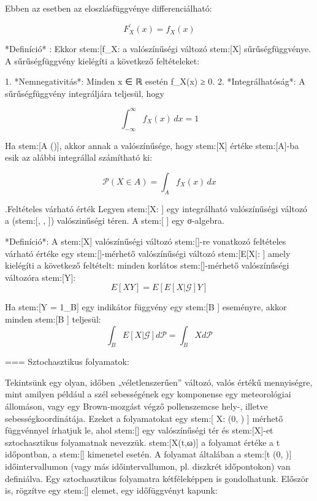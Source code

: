 \documentclass[11pt]{article}
\begin{document}
Ebben az esetben az eloszlásfüggvénye differenciálható:

\[
F_X^{\prime}(x) = f_X(x)
\]

*Definíció* : Ekkor stem:[f_X:  \to [0, \infty)] a valószínűségi változó stem:[X] sűrűségfüggvénye. A sűrűségfüggvény kielégíti a következő feltételeket:

1. *Nemnegativitás*: Minden x ∈ ℝ esetén f_X(x) ≥ 0.
2. *Integrálhatóság*: A sűrűségfüggvény integráljára teljesül, hogy

\[
\int_{-\infty}^{\infty} f_X(x) \, dx = 1
\]

Ha stem:[A \in {}()], akkor annak a valószínűsége, hogy stem:[X] értéke stem:[A]-ba esik az alábbi integrállal számítható ki:

\[
\mathcal{P}(X \in A) = \int_A f_X(x) \, dx
\]

.Feltételes várható érték
Legyen stem:[X: \Omega \to {}] egy integrálható valószínűségi változó a (stem:[\Omega, , ]) valószinűségi téren.
A stem:[ \subseteq {}] egy σ-algebra.

*Definíció*: A stem:[X] valószínűségi változó stem:[]-re vonatkozó feltételes várható értéke egy stem:[]-mérhető valószínűségi változó stem:[E[X|\]: \Omega \to {}]
amely kielégíti a következő feltételt: minden korlátos stem:[]-mérhető valószínűségi változóra stem:[Y]:
\[
E[XY] = E[E[X|\mathcal{G}]Y]
\]

Ha stem:[Y = 1_B] egy indikátor függvény egy stem:[B \in {}] eseményre, akkor minden stem:[B \in {}] teljesül:
\[
\int _B E[X|\mathcal{G}] d\mathcal{P} = \int_B X d\mathcal{P}
\]


=== Sztochasztikus folyamatok:

Tekintsünk egy olyan, időben „véletlenszerűen” változó, valós értékű mennyiségre, mint amilyen például a szél sebességének egy komponense egy meteorológiai állomáson,
vagy egy Brown-mozgást végző pollenszemcse hely-, illetve sebességkoordinátája.
Ezeket a folyamatokat egy stem:[ X: (0, \infty) \times \Omega \to {} ] mérhető függvénnyel írhatjuk le, ahol stem:[\Omega] egy valószínűségi tér
és stem:[X]-et sztochasztikus folyamatnak nevezzük. stem:[X(t,ω)] a folyamat értéke a t időpontban, a stem:[\omega \in \Omega] kimenetel esetén.
 A folyamat általában a stem:[t \in (0, \infty)] időintervallumon (vagy más időintervallumon, pl. diszkrét időpontokon) van definiálva.
Egy sztochasztikus folyamatra kétféleképpen is gondolhatunk. Először is, rögzítve egy stem:[\omega \in \Omega] elemet, egy időfüggvényt kapunk:
\end{document}
